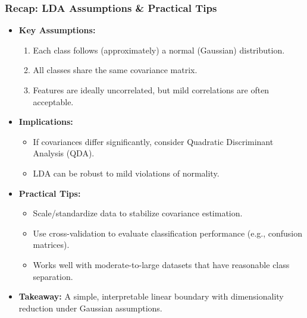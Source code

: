 \documentclass[aspectratio=169]{beamer}
\begin{document}
\begin{frame}
    \frametitle{Recap: LDA Assumptions \& Practical Tips}
    \begin{itemize}
        \item \textbf{Key Assumptions:}
            \begin{enumerate}
                \item Each class follows (approximately) a normal (Gaussian) distribution.
                \item All classes share the same covariance matrix.
                \item Features are ideally uncorrelated, but mild correlations are often acceptable.
            \end{enumerate}
        \item \textbf{Implications:}
            \begin{itemize}
                \item If covariances differ significantly, consider Quadratic Discriminant Analysis (QDA).
                \item LDA can be robust to mild violations of normality.
            \end{itemize}
        \item \textbf{Practical Tips:}
            \begin{itemize}
                \item Scale/standardize data to stabilize covariance estimation.
                \item Use cross-validation to evaluate classification performance (e.g., confusion matrices).
                \item Works well with moderate-to-large datasets that have reasonable class separation.
            \end{itemize}
        \item \textbf{Takeaway:} 
            A simple, interpretable linear boundary with dimensionality reduction under Gaussian assumptions.
    \end{itemize}
\end{frame}
\end{document}
